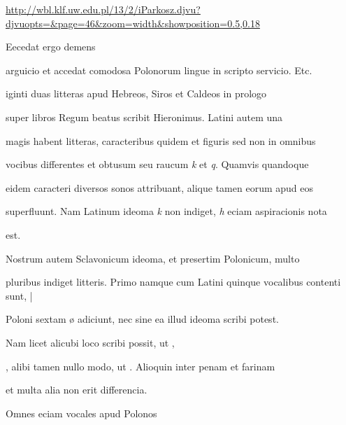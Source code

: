 \url{http://wbl.klf.uw.edu.pl/13/2/iParkosz.djvu?djvuopts=&page=46&zoom=width&showposition=0.5,0.18}

\begin{VerbatimLatin}[numbers=none,formatcom=\color{blue}]
Eecedat ergo demens 
\end{VerbatimLatin}
%
\renewcommand{\theFancyVerbLine}{06-0\arabic{FancyVerbLine}\phantom{a}}
%
\begin{VerbatimLatin}
arguicio et accedat comodosa Polonorum lingue in scripto servicio. Etc.

iginti duas litteras apud Hebreos, Siros et Caldeos in prologo

super libros Regum beatus scribit Hieronimus. Latini autem una

magis habent litteras, caracteribus quidem et figuris sed non in omnibus

vocibus differentes et obtusum seu raucum \textit{k} et \textit{q}. Quamvis quandoque

eidem caracteri diversos sonos attribuant, alique tamen eorum apud eos

superfluunt. Nam Latinum ideoma \textit{k} non indiget, \textit{h} eciam aspiracionis nota
\end{VerbatimLatin}
\renewcommand{\theFancyVerbLine}{\textcolor{green}{06-08\alph{FancyVerbLine}}}
\begin{VerbatimLatin}[firstnumber=1]
est.

\indentK Nostrum autem Sclavonicum ideoma, et presertim Polonicum, multo
\end{VerbatimLatin}
\renewcommand{\theFancyVerbLine}{06-0\arabic{FancyVerbLine}\phantom{a}}
%
\begin{VerbatimLatin}[firstnumber=9]
pluribus indiget litteris. Primo namque cum Latini quinque vocalibus contenti sunt, |
\end{VerbatimLatin}
\renewcommand{\theFancyVerbLine}{06-\arabic{FancyVerbLine}\phantom{a}}
%
\begin{VerbatimLatin}[firstnumber=10]
Poloni  sextam ø adiciunt, nec sine ea illud ideoma scribi potest.

Nam licet alicubi loco   scribi possit, ut  , 

, alibi tamen nullo modo, ut  . Alioquin inter penam et farinam
\end{VerbatimLatin}
\renewcommand{\theFancyVerbLine}{\textcolor{green}{06-13\alph{FancyVerbLine}}}
\begin{VerbatimLatin}[firstnumber=1]
et multa alia non erit differencia.

\indentK Omnes eciam vocales apud Polonos
\end{VerbatimLatin}
